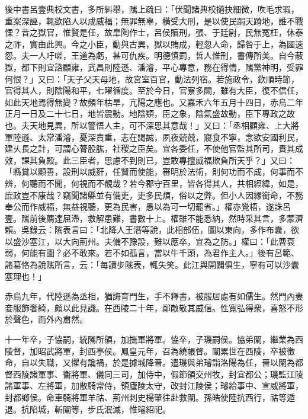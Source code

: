 \begin{pinyinscope}
後中書呂壹典校文書，多所糾舉，隲上疏曰：「伏聞諸典校擿抉細微，吹毛求瑕，重案深誣，輒欲陷人以成威福；無罪無辜，橫受大刑，是以使民跼天蹐地，誰不戰慄？昔之獄官，惟賢是任，故皐陶作士，呂侯贖刑，張、于廷尉，民無冤枉，休泰之祚，實由此興。今之小臣，動與古異，獄以賄成，輕忽人命，歸咎于上，為國速怨。夫一人吁嗟，王道為虧，甚可仇疾。明德慎罰，哲人惟刑，書傳所美。自今蔽獄，都下則宜諮顧雍，武昌則陸遜、潘濬，平心專意，務在得情，隲黨神明，受罪何恨？」又曰：「天子父天母地，故宮室百官，動法列宿。若施政令，欽順時節，官得其人，則陰陽和平，七曜循度。至於今日，官寮多闕，雖有大臣，復不信任，如此天地焉得無變？故頻年枯旱，亢陽之應也。又嘉禾六年五月十四日，赤烏二年正月一日及二十七日，地皆震動。地陰類，臣之象，陰氣盛故動，臣下專政之故也。夫天地見異，所以警悟人主，可不深思其意哉！」又曰：「丞相顧雍、上大將軍陸遜、太常潘濬，憂深責重，志在謁誠，夙夜兢兢，寢食不寧，念欲安國利民，建乆長之計，可謂心膂股肱，社稷之臣矣。宜各委任，不使他官監其所司，責其成效，課其負殿。此三臣者，思慮不到則已，豈敢專擅威福欺負所天乎？」又曰：「縣賞以顯善，設刑以威姧，任賢而使能，審明於法術，則何功而不成，何事而不辨，何聽而不聞，何視而不覩哉？若今郡守百里，皆各得其人，共相經緯，如是，庶政豈不康哉？竊聞諸縣並有備吏，吏多民煩，俗以之弊。但小人因緣銜命，不務奉公而作威福，無益視聽，更為民害，愚以為可一切罷省。」權亦覺梧，遂誅呂壹。隲前後薦達屈滯，救解患難，書數十上。權雖不能悉納，然時采其言，多蒙濟賴。吳錄云：隲表言曰：「北降人王潛等說，此相部伍，圖以東向，多作布囊，欲以盛沙塞江，以大向荊州。夫備不豫設，難以應卒，宜為之防。」權曰：「此曹衰弱，何能有圖？必不敢來。若不如孤言，當以牛千頭，為君作主人。」後有呂範、諸葛恪為說隲所言，云：「每讀步隲表，輒失笑。此江與開闢俱生，寧有可以沙囊塞理也！」

赤烏九年，代陸遜為丞相，猶誨育門生，手不釋書，被服居處有如儒生。然門內妻妾服飾奢綺，頗以此見譏。在西陵二十年，鄰敵敬其威信。性寬弘得衆，喜怒不形於聲色，而外內肅然。

十一年卒，子恊嗣，統隲所領，加撫軍將軍。恊卒，子璣嗣侯。恊弟闡，繼業為西陵督，加昭武將軍，封西亭侯。鳳皇元年，召為繞帳督。闡累世在西陵，卒被徵命，自以失職，又懼有讒禍，於是據城降晉。遣璣與弟璿詣洛陽為任，晉以闡為都督西陵諸軍事、衞將軍、儀同三司，加侍中，假節領交州牧，封宜都公；璣監江陵諸軍事、左將軍，加散騎常侍，領廬陵太守，改封江陵侯；璿給事中、宣威將軍，封都鄉侯。命車騎將軍羊祜、荊州刺史楊肇往赴救闡。孫皓使陸抗西行，祜等遁退。抗陷城，斬闡等，步氏泯滅，惟璿紹祀。


\end{pinyinscope}
